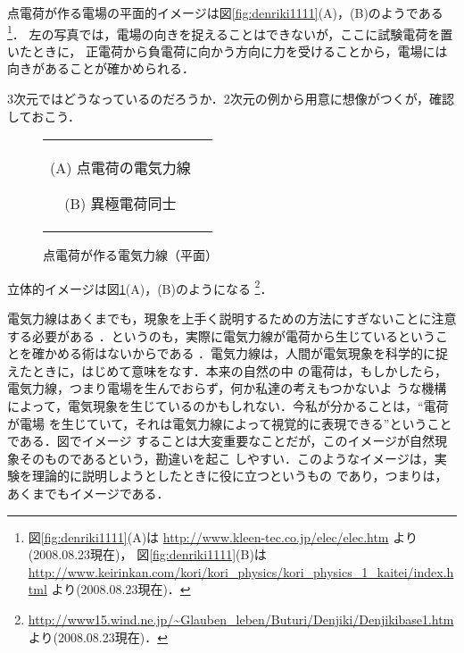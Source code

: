             点電荷が作る電場の平面的イメージは図\ref{fig:denriki1111}(A)，(B)のようである
                \footnote{
                    図\ref{fig:denriki1111}(A)は
                        \url{http://www.kleen-tec.co.jp/elec/elec.htm}
                    より(2008.08.23現在)，
                    図\ref{fig:denriki1111}(B)は
                        \url{http://www.keirinkan.com/kori/kori_physics/kori_physics_1_kaitei/index.html}
                    より(2008.08.23現在)．
                }．
            左の写真では，電場の向きを捉えることはできないが，ここに試験電荷を置いたときに，
            正電荷から負電荷に向かう方向に力を受けることから，電場には向きがあることが確かめられる．

            3次元ではどうなっているのだろうか．2次元の例から用意に想像がつくが，確認しておこう．
                \begin{figure}[hbt]
                    \begin{tabular}{cc}
                        \begin{minipage}{0.5\hsize}
                            \begin{center}
                                {E_FILED_Point.pdf}

                                (A) 点電荷の電気力線
                            \end{center}
                        \end{minipage}
                        \begin{minipage}{0.5\hsize}
                            \begin{center}
                                {E_FILED_dipole.pdf}

                                (B) 異極電荷同士
                            \end{center}
                        \end{minipage}
                    \end{tabular}
                    \caption{点電荷が作る電気力線（平面）\label{fig:E_FILED_Point}}
                \end{figure}
            立体的イメージは図\ref{fig:E_FILED_Point}(A)，(B)のようになる
            \footnote{
                \url{http://www15.wind.ne.jp/~Glauben_leben/Buturi/Denjiki/Denjikibase1.htm}より(2008.08.23現在)．
            }．

            電気力線はあくまでも，現象を上手く説明するための方法にすぎないことに注意する必要がある
            ．というのも，実際に電気力線が電荷から生じているということを確かめる術はないからである
            ．電気力線は，人間が電気現象を科学的に捉えたときに，はじめて意味をなす．本来の自然の中
            の電荷は，もしかしたら，電気力線，つまり電場を生んでおらず，何か私達の考えもつかないよ
            うな機構によって，電気現象を生じているのかもしれない．今私が分かることは，“電荷が電場
            を生じていて，それは電気力線によって視覚的に表現できる”ということである．図でイメージ
            することは大変重要なことだが，このイメージが自然現象そのものであるという，勘違いを起こ
            しやすい．このようなイメージは，実験を理論的に説明しようとしたときに役に立つというもの
            であり，つまりは，あくまでもイメージである．


